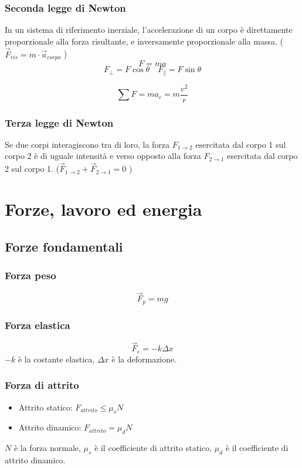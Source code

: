 \documentclass[a4paper]{article}
\theoremstyle{break}
\theoremstyle{break}
\theoremstyle{break}
\theoremstyle{break}
\begin{document}
\subsubsection{Seconda legge di Newton}
In un sistema di riferimento inerziale, l’accelerazione di un corpo è direttamente proporzionale alla
forza risultante, e inversamente proporzionale alla massa. (\( \vec{F}_{ris} = m \cdot \vec{a}_{corpo} \) )
\[
F = m a
\] 
\[
  F_{\perp} = F \cos \theta \quad F_{\parallel} = F \sin \theta
\] 

\[
  \sum F = m a_c = m \frac{v^2}{r}
\] 

\subsubsection{Terza legge di Newton}
Se due corpi interagiscono tra di loro, la forza \( F_{1 \to 2} \) esercitata dal corpo 1 sul corpo 2 è di uguale
intensità e verso opposto alla forza \( F_{2 \to 1} \) esercitata dal corpo 2 sul corpo 1.
(\( \vec{F}_{1 \to 2} + \vec{F}_{2 \to 1} = 0 \) )


\section{Forze, lavoro ed energia}
\subsection{Forze fondamentali}
\subsubsection{Forza peso}
\[
  \vec{F}_p = mg
\]
\subsubsection{Forza elastica}
\[
  \vec{F}_e = -k \Delta x
\]
\( -k \) è la costante elastica, \( \Delta x \) è la deformazione.
\subsubsection{Forza di attrito}
\begin{itemize}
  \item Attrito statico: \( F_{attrito} \leq \mu_s N \)
  \item Attrito dinamico: \( F_{attrito} = \mu_d N \)
\end{itemize}
\( N \) è la forza normale, \( \mu_s \) è il coefficiente di attrito statico, \( \mu_d \) è il coefficiente di attrito dinamico. 
\end{document}
